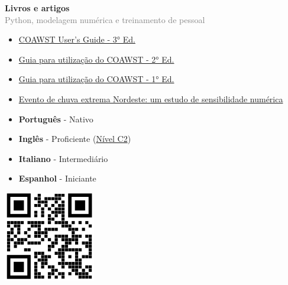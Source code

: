 \documentclass[9pt]{developercv} %
\begin{document}
\begin{minipage}[t]{0.3\textwidth}
	\vspace{-\baselineskip} %
	
	
	\textbf{Livros e artigos} \\
	\textcolor{gray}{Python, modelagem numérica e treinamento de pessoal}
	 \begin{itemize}
		\itemsep-0.3em
		\item \textcolor{bleu_cite}{\href{http://mtc-m21c.sid.inpe.br/col/sid.inpe.br/mtc-m21c/2020/10.02.15.11/doc/publicacao.pdf}{COAWST User's Guide - 3° Ed.}}
		\item \textcolor{bleu_cite}{\href{http://mtc-m21c.sid.inpe.br/col/sid.inpe.br/mtc-m21c/2019/09.05.18.15/doc/publicacao.pdf}{Guia para utilização do COAWST - 2° Ed.}}
		\item \textcolor{bleu_cite}{\href{http://mtc-m21c.sid.inpe.br/col/sid.inpe.br/mtc-m21c/2018/09.13.17.45/doc/publicacao.pdf}{Guia para utilização do COAWST - 1° Ed.}}
		\item \textcolor{bleu_cite}{\href{https://link.springer.com/article/10.1007/s00703-020-00747-0}{Evento de chuva extrema Nordeste: um estudo de sensibilidade numérica}}
	 \end{itemize}  
\end{minipage}
\hfill
\begin{minipage}[t]{0.3\textwidth}
	\vspace{-\baselineskip} %

	\vspace{-0.3cm}
	\begin{itemize}
	\itemsep0em
	\item \textbf{Português} - Nativo
	\item \textbf{Inglês} - Proficiente (\href{https://www.efset.org/cert/PrWqbW}{\textcolor{bleu_cite}{Nível C2}})
	\item \textbf{Italiano} - Intermediário 
	\item \textbf{Espanhol} - Iniciante
	\end{itemize}
	\vspace{0.8cm}
	
	\centering\includegraphics[width=0.3\textwidth]{qrcode.png}
\end{minipage}
\end{document}
